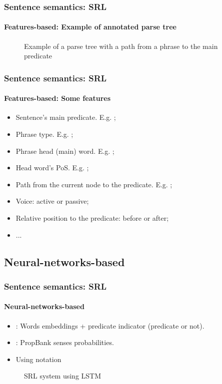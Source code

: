 \documentclass[xcolor=table]{beamer}
\begin{document}
\begin{frame}
	\frametitle{Sentence semantics: SRL}
	\framesubtitle{Features-based: Example of annotated parse tree}
	
	\vspace{-0.2cm}
	\begin{figure}
		\caption{Example of a parse tree with a path from a phrase to the main predicate \cite{2019-jurafsky-martin}}
	\end{figure}
	
\end{frame}

\begin{frame}
	\frametitle{Sentence semantics: SRL}
	\framesubtitle{Features-based: Some features}

	\begin{itemize}
		\item Sentence's main predicate. E.g. ;
		\item Phrase type. E.g. ;
		\item Phrase head (main) word. E.g. ; 
		\item Head word's PoS. E.g. ;
		\item Path from the current node to the predicate. E.g. ;
		\item Voice: active or passive;
		\item Relative position to the predicate: before or after;
		\item ...
	\end{itemize}
	
\end{frame}

\subsection{Neural-networks-based}

\begin{frame}
	\frametitle{Sentence semantics: SRL}
	\framesubtitle{Neural-networks-based}

	\begin{minipage}{.48\textwidth}
		\begin{itemize}
			\item {}: Words embeddings + predicate indicator (predicate or not).
			\item {}: PropBank senses probabilities.  
			\item Using  notation
		\end{itemize}
	\end{minipage}
	\begin{minipage}{.5\textwidth}
		\begin{figure}
			\caption{SRL system using LSTM \cite{2017-he-al}}
		\end{figure}
	\end{minipage}
	
\end{frame}
\end{document}

